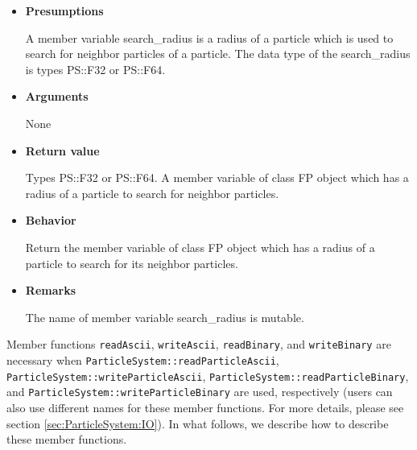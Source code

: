 \begin{itemize}

\item {\bf Presumptions}

  A member variable search\_radius is a radius of a particle which is
  used to search for neighbor particles of a particle.  The data type
  of the search\_radius is types PS::F32 or PS::F64.
  
\item {\bf Arguments}

  None
  
\item {\bf Return value}

  Types PS::F32 or PS::F64. A member variable of class FP object which
  has a radius of a particle to search for neighbor particles.
  
\item {\bf Behavior}

  Return the member variable of class FP object which has a radius of
  a particle to search for its neighbor particles.
  
\item {\bf Remarks}

  The name of member variable search\_radius is mutable.
  
\end{itemize}

\label{sec:example_userdefined_fullparticle_io}

Member functions \texttt{readAscii}, \texttt{writeAscii}, \texttt{readBinary}, and \texttt{writeBinary} are necessary when \texttt{ParticleSystem::readParticleAscii}, \texttt{ParticleSystem::writeParticleAscii}, \texttt{ParticleSystem::readParticleBinary}, and \texttt{ParticleSystem::writeParticleBinary} are used, respectively (users can also use different names for these member functions. For more details, please see section \ref{sec:ParticleSystem:IO}). In what follows, we describe how to describe these member functions.


